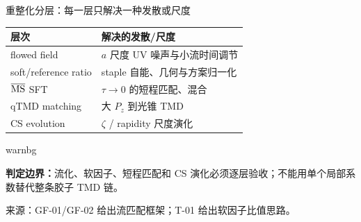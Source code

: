 \documentclass[UTF8,aspectratio=169,11pt]{ctexbeamer}
\newcommand{\source}[1]{%
  \par\vspace{0.05em}%
  {\raggedright\scriptsize\color{muted}来源：#1\par}}
\begin{document}
\begin{frame}[t]{重整化分层：每一层只解决一种发散或尺度}
  \centering
  {\footnotesize
  \begin{tabularx}{0.94\textwidth}{@{}lX@{}}
    \toprule
    层次 & 解决的发散/尺度 \\
    \midrule
    flowed field & $a$ 尺度 UV 噪声与小流时间调节\\
    soft/reference ratio & staple 自能、几何与方案归一化\\
    $\overline{\rm MS}$ SFT & $\tau\to0$ 的短程匹配、混合\\
    qTMD matching & 大 $P_z$ 到光锥 TMD\\
    CS evolution & $\zeta$ / rapidity 尺度演化\\
    \bottomrule
  \end{tabularx}\par}
  \vspace{0.35em}
  \begin{beamercolorbox}[wd=0.94\textwidth,sep=0.55em,rounded=true]{warnbg}
    {\footnotesize
    \textbf{判定边界：}流化、软因子、短程匹配和 CS 演化必须逐层验收；不能用单个局部系数替代整条胶子 TMD 链。\par}
  \end{beamercolorbox}
  \source{GF-01/GF-02 给出流匹配框架；T-01 给出软因子比值思路。}
\end{frame}
\end{document}
